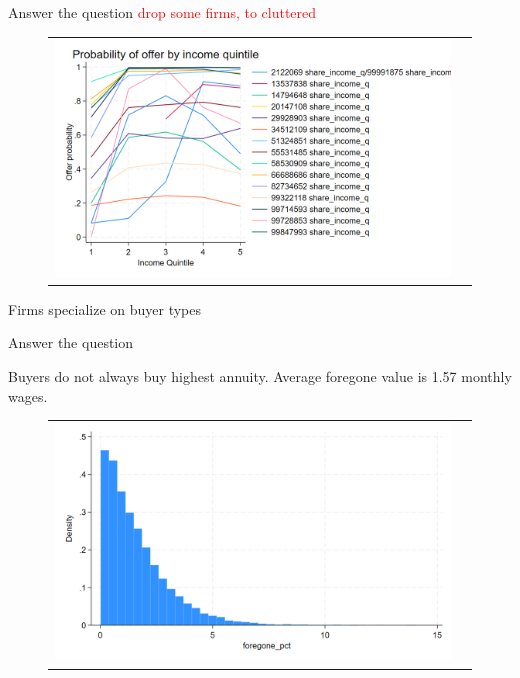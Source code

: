 \documentclass[notes, 10pt,aspectratio=169]{beamer}
\begin{document}
\begin{frame}{Answer the question}\label{slide:fig2}    
\textcolor{red}{drop some firms, to cluttered}

\begin{figure}[H]
\caption{}
\centering{}%
\begin{tabular}{cc}
\includegraphics[scale=0.24]{../figures/IE3_supply_offerprob_income_q.png}
\end{tabular}
\end{figure}

Firms specialize on buyer types
\end{frame}

\begin{frame}{Answer the question}\label{slide:fig3}    

Buyers do not always buy highest annuity. Average foregone value is 1.57 monthly wages.

\begin{figure}[H]
\centering{}%
\begin{tabular}{cc}
\includegraphics[scale=0.27]{../figures/IE3_foregone_hist.png}
\end{tabular}
\end{figure}
\end{frame}
 
\end{document}
